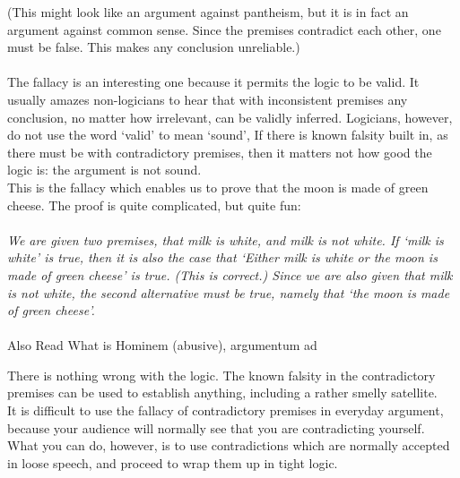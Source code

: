 \documentclass[a4paper,12pt,single,pdftex]{scrartcl}
\begin{document}
      
        (This might look like an argument against pantheism, but it is in fact an argument against common sense. Since the premises contradict each other, one must be false. This makes any conclusion unreliable.)
      \\

      
         
      \\

      
        The fallacy is an interesting one because it permits the logic to be valid. It usually amazes non-logicians to hear that with inconsistent premises any conclusion, no matter how irrelevant, can be validly inferred. Logicians, however, do not use the word ‘valid’ to mean ‘sound’, If there is known falsity built in, as there must be with contradictory premises, then it matters not how good the logic is: the argument is not sound.
      \\

      
        This is the fallacy which enables us to prove that the moon is made of green cheese. The proof is quite complicated, but quite fun:
      \\

      
         
      \\

      
        {\em We are given two premises, that milk is white, and milk is not white. If ‘milk is white’ is true, then it is also the case that ‘Either milk is white or the moon is made of green cheese’ is true. (This is correct.) Since we are also given that milk is not white, the second alternative must be true, namely that ‘the moon is made of green cheese’.}
      \\

      
         
      \\

      
        

        
          Also Read  What is Hominem (abusive), argumentum ad
        
      
      
        There is nothing wrong with the logic. The known falsity in the contradictory premises can be used to establish anything, including a rather smelly satellite.
      \\

      
        It is difficult to use the fallacy of contradictory premises in everyday argument, because your audience will normally see that you are contradicting yourself. What you can do, however, is to use contradictions which are normally accepted in loose speech, and proceed to wrap them up in tight logic.
      \\
\end{document}
